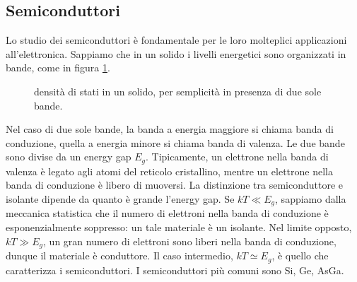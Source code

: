 \documentclass[a4paper, 11pt]{article}
\begin{document}
	\subsection{Semiconduttori}
	Lo studio dei semiconduttori è fondamentale per le loro molteplici applicazioni all'elettronica. Sappiamo che in un solido i livelli energetici sono organizzati in bande, come in figura \ref{fig:bande}.
	\begin{figure}[h!]
		\centering
		\caption{densità di stati in un solido, per semplicità in presenza di due sole bande.}
		\label{fig:bande}
	\end{figure}
	Nel caso di due sole bande, la banda a energia maggiore si chiama banda di conduzione, quella a energia minore si chiama banda di valenza. Le due bande sono divise da un energy gap $E_g$. Tipicamente, un elettrone nella banda di valenza è legato agli atomi del reticolo cristallino, mentre un elettrone nella banda di conduzione è libero di muoversi. La distinzione tra semiconduttore e isolante dipende da quanto è grande l'energy gap. Se $kT\ll E_g$, sappiamo dalla meccanica statistica che il numero di elettroni nella banda di conduzione è esponenzialmente soppresso: un tale materiale è un isolante. Nel limite opposto, $kT\gg E_g$, un gran numero di elettroni sono liberi nella banda di conduzione, dunque il materiale è conduttore. Il caso intermedio, $kT\simeq E_g$, è quello che caratterizza i semiconduttori. I semiconduttori più comuni sono Si, Ge, AsGa. 
	
\end{document}
